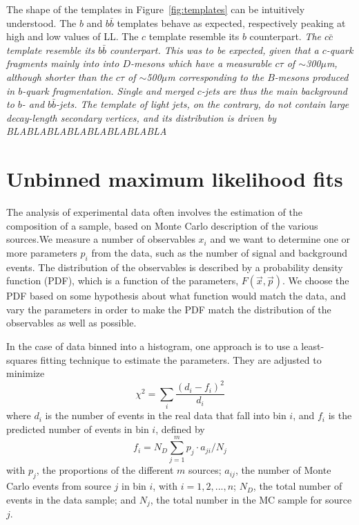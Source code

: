 The shape of the templates in Figure~\ref{fig:templates} can be intuitively understood. The $b$ and $b\bar{b}$ templates behave as expected, respectively peaking at high and low values of LL. The $c$ template resemble its $b$ counterpart.
\emph{The $c\bar{c}$ template resemble its $b\bar{b}$ counterpart. This was to be expected, given that a $c$-quark fragments mainly into into $D$-mesons which have a measurable $c\tau$ of $\sim$300$\mu$m, although shorter than the  $c\tau$ of $\sim$500$\mu$m corresponding to the $B$-mesons produced in $b$-quark fragmentation. Single and merged $c$-jets are thus the main background to $b$- and $b\bar{b}$-jets. The template of light jets, on the contrary, do not contain large decay-length secondary vertices, and its distribution is driven by BLABLABLABLABLABLABLABLA}



\section{Unbinned maximum likelihood fits}\label{sec:LLFits}

The analysis of experimental data often involves the estimation of the composition of a sample, based on Monte Carlo description of the various sources.We measure a number of observables $x_i$ and we want to determine one or more parameters $p_i$ from the data, such as the number of signal and background events. The distribution  of the observables is described by a probability density function (PDF), which is a function of %
the parameters, $F(\vec{x},\vec{p})$.  We choose the PDF based on some hypothesis about what function would match the data, and vary the parameters in order to make the PDF match the distribution of the observables as well as possible. 


In the case of data binned into a histogram, one approach is to use a least-squares fitting technique to estimate the parameters. They are adjusted to minimize
%
\begin{equation}
\chi^2 = \sum_i \frac{(d_i - f_i)^2}{d_i}
 \label{eq:chi2}
\end{equation}
%
where $d_i$ is the number of events in the real data that fall into bin $i$, and $f_i$ is the predicted number of events in bin $i$, defined by
%
\begin{equation}
f_i = N_D\sum^m_{j=1} p_j \cdot a_{ji}/N_j
\end{equation}
%
with $p_j$, the proportions of the different $m$ sources; $a_{ij}$, the number of Monte Carlo events from source $j$ in bin $i$, with $i=1,2,...,n$; $N_D$, the total number of events in the data sample; and $N_j$, the total number in the MC sample for source $j$.

